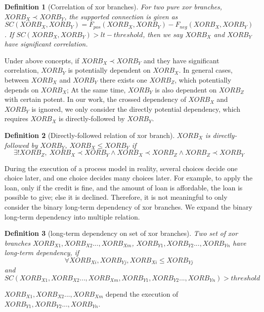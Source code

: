 \documentclass[]{article}
\newtheorem{mydef}{Definition}[section]
\begin{document}
\begin{mydef}[Correlation of xor branches]
	\label{def: supported-connection}
For two pure xor branches, $XORB_X \prec XORB_Y$, the supported connection is given as \[SC(XORB_X,XORB_Y)= F_{pos}(XORB_X, XORB_Y) -F_{neg}(XORB_X, XORB_Y)\]. If $SC(XORB_X,XORB_Y) > lt-threshold$, then we say $XORB_X$ and $XORB_Y$ have significant correlation.
\end{mydef}
Under above concepts, if $XORB_X \prec XORB_Y$ and they have significant correlation,  $XORB_Y$ is potentially dependent on  $XORB_X$. In general cases, between $XORB_X$ and $XORB_Y$ there exists one $XORB_Z$, which potentially depends on $XORB_X$; At the same time, $XORB_Y$ is also dependent on $XORB_Z$ with certain potent. In our work, the crossed dependency of $XORB_X$ and $XORB_Y$ is ignored, we only consider the directly potential dependency, which requires $XORB_X$ is directly-followed by $XORB_Y$. 
\begin{mydef}[Directly-followed relation of xor branch]
	$XORB_X$ is directly-followed by $XORB_Y$, $XORB_X \leq XORB_Y$ if 
	\[ \exists ! XORB_Z, \: XORB_X \prec XORB_Y \land XORB_X \prec XORB_Z \land XORB_Z \prec XORB_Y \]
\end{mydef}

During the execution of a process model in reality, several choices decide one choice later, and one choice decides many choices later. For example, to apply the loan, only if the credit is fine, and the amount of loan is affordable, the loan is possible to give; else it is declined. Therefore, it is not meaningful to only consider the binary long-term dependency of xor branches. We expand the binary long-term dependency into multiple relation. 
\begin{mydef}[long-term dependency on set of xor branches]
	\label{def: branches-final-lt}
	Two set of xor branches ${XORB_{X1}, XORB_{X2}..., XORB_{Xm}}$, ${XORB_{Y1}, XORB_{Y2}..., XORB_{Yn}}$ have long-term dependency, if 
	\[\forall XORB_{Xi},XORB_{Yj}, XORB_{Xi} \leq XORB_{Yj} \] and
	\[SC({XORB_{X1}, XORB_{X2}..., XORB_{Xm}}, {XORB_{Y1}, XORB_{Y2}..., XORB_{Yn}}) > threshold  \]
\end{mydef}
${XORB_{X1}, XORB_{X2}..., XORB_{Xm}}$ depend the execution of ${XORB_{Y1}, XORB_{Y2}..., XORB_{Yn}}$. 
\end{document}
